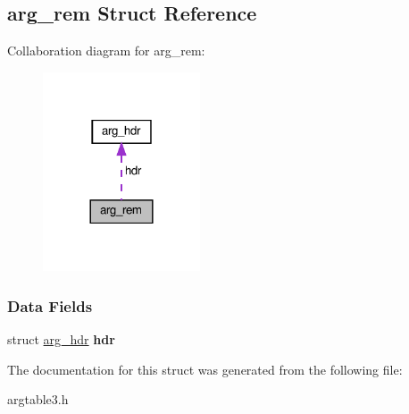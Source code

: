 \hypertarget{structarg__rem}{}\subsection{arg\+\_\+rem Struct Reference}
\label{structarg__rem}


Collaboration diagram for arg\+\_\+rem\+:\nopagebreak
\begin{figure}[H]
\begin{center}
\leavevmode
\includegraphics[width=132pt]{structarg__rem__coll__graph}
\end{center}
\end{figure}
\subsubsection*{Data Fields}
\begin{DoxyCompactItemize}
\item 
\mbox{\label{structarg__rem_afc389187361d2c1f2b18760b59dc7bfc}} 
struct \hyperlink{structarg__hdr}{arg\+\_\+hdr} {\bfseries hdr}
\end{DoxyCompactItemize}


The documentation for this struct was generated from the following file\+:\begin{DoxyCompactItemize}
\item 
argtable3.\+h\end{DoxyCompactItemize}
